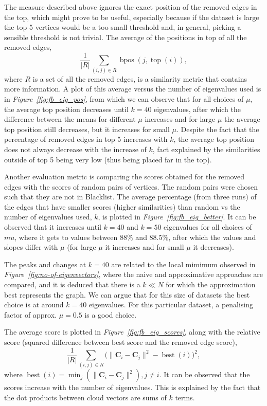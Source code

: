 \documentclass[12pt]{report}
\DeclareMathOperator{\ttop}{top}
\DeclareMathOperator{\bpos}{bpos}
\begin{document}
The measure described above ignores the exact position of the removed edges in
the top, which might prove to be useful, especially because if the dataset is
large the top 5 vertices would be a too small threshold and, in general, picking
a sensible threshold is not trivial. The average of the positions in top of
all the removed edges,
\begin{equation}
  \frac{1}{|R|} \sum_{(i,j) \in R} \bpos(j, \ttop(i)),
\end{equation}
where $R$ is a set of all the removed edges, is a similarity metric that contains
more information. A plot of this average versus the number of eigenvalues used
is in \emph{Figure~\ref{fig:fb_eig_pos}}, from which we can observe that for
all choices of $\mu$, the average top position decreases until $k=40$
eigenvalues, after which the difference between the means for different $\mu$
increases and for large $\mu$ the average top position still decreases, but it
increases for small $\mu$. Despite the fact that the percentage of removed edges
in top 5 increases with $k$, the average top position does not always decrease
with the increase of $k$, fact explained by the similarities outside of top 5
being very low (thus being placed far in the top).


Another evaluation metric is comparing the scores obtained for the removed edges
with the scores of random pairs of vertices. The random pairs were chosen such
that they are not in Blacklist. The average percentage (from three runs) of
the edges that have smaller scores (higher similarities) than random vs the
number of eigenvalues used, $k$, is plotted in \emph{Figure~\ref{fig:fb_eig_better}}.
It can be observed that it increases until $k=40$ and $k=50$ eigenvalues for all
choices of $mu$, where it gets to values between $88\%$ and $88.5\%$, after
which the values and slopes differ with $\mu$ (for large $\mu$ it increases and
for small $\mu$ it decreases).


The peaks and changes at $k=40$ are related to the local mimimum observed in
\emph{Figure~\ref{fig:no-of-eigenvectors}}, where the naive and approximative
approaches are compared, and it is deduced that there is a $k \ll N$ for which
the approximation best represents the graph. We can argue that for this size of
datasets the best choice is at around $k=40$ eigenvalues. For this particular
dataset, a penalising factor of approx. $\mu = 0.5$ is a good choice.


The average score is plotted in \emph{Figure~\ref{fig:fb_eig_scores}}, along
with the relative score (squared difference between best score and the removed
edge score),
\begin{equation}
  \frac{1}{|R|} \sum_{(i,j) \in R}
    \big(\|\bm{C}_i - \bm{C}_j\|^2 - \operatorname{best}(i)\big)^2,
\end{equation}
where $\operatorname{best}(i) = \min_{j} (\|\bm{C}_i - \bm{C}_j\|^2), j \neq i $.
It can be observed that the scores increase with the number of eigenvalues. This
is explained by the fact that the dot products between cloud vectors are sums of
$k$ terms.
\end{document}
